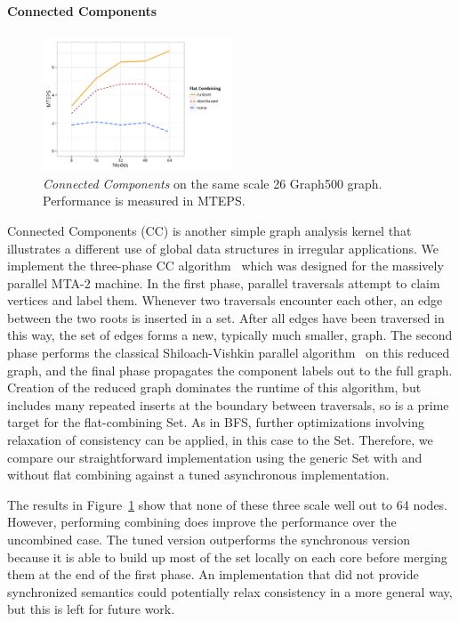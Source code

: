 \paragraph{Connected Components}
\begin{figure}[t]
  \centering
  \includegraphics[width=0.5\textwidth]{data/plots/cc_perf.pdf}
  \caption{\emph{Connected Components} on the same scale 26 Graph500 graph. Performance is measured in MTEPS.}
  \label{fig:cc_perf}
\end{figure}
Connected Components (CC) is another simple graph analysis kernel that illustrates a different use of global data structures in irregular applications. We implement the three-phase CC algorithm~\cite{mtgl} which was designed for the massively parallel MTA-2 machine. In the first phase, parallel traversals attempt to claim vertices and label them.
Whenever two traversals encounter each other, an edge between the two roots is inserted in a set. After all edges have been traversed in this way, the set of edges forms a new, typically much smaller, graph. The second phase performs the classical Shiloach-Vishkin parallel algorithm~\cite{shiloach1982n} on this reduced graph, and the final phase propagates the component labels out to the full graph.
Creation of the reduced graph dominates the runtime of this algorithm, but includes many repeated inserts at the boundary between traversals, so is a prime target for the flat-combining Set.
As in BFS, further optimizations involving relaxation of consistency can be applied, in this case to the Set. Therefore, we compare our straightforward implementation using the generic Set with and without flat combining against a tuned asynchronous implementation.

The results in Figure~\ref{fig:cc_perf} show that none of these three scale well out to 64 nodes. However, performing combining does improve the performance over the uncombined case. The tuned version outperforms the synchronous version because it is able to build up most of the set locally on each core before merging them at the end of the first phase. An implementation that did not provide synchronized semantics could potentially relax consistency in a more general way, but this is left for future work.
